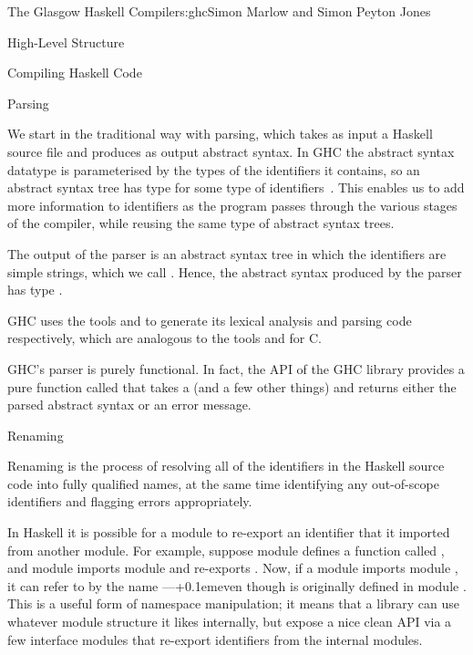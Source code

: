 \begin{aosachapter}{The Glasgow Haskell Compiler}{s:ghc}{Simon Marlow and Simon Peyton Jones}
\begin{aosasect1}{High-Level Structure}
\begin{aosasect2}{Compiling Haskell Code}

\begin{aosasect3}{Parsing}

We start in the traditional way with parsing, which takes as input a
Haskell source file and produces as output abstract syntax.  In GHC
the abstract syntax datatype  is parameterised by the
types of the identifiers it contains, so an abstract syntax tree has
type  for some type of identifiers~.  This
enables us to add more information to identifiers as the program
passes through the various stages of the compiler, while reusing the
same type of abstract syntax trees.

The output of the parser is an abstract syntax tree in which the
identifiers are simple strings, which we call .  Hence,
the abstract syntax produced by the parser has type .

GHC uses the tools  and  to generate its
lexical analysis and parsing code respectively, which are analogous to
the tools  and  for C.

GHC's parser is purely functional.  In fact, the API of the GHC
library provides a pure function called  that takes a
 (and a few other things) and returns either the parsed
abstract syntax or an error message.

\end{aosasect3}

\begin{aosasect3}{Renaming}

Renaming is the process of resolving all of the identifiers in the
Haskell source code into fully qualified names, at the same time
identifying any out-of-scope identifiers and flagging errors
appropriately.

In Haskell it is possible for a module to re-export an identifier that
it imported from another module.  For example, suppose module 
defines a function called , and module  imports module
 and re-exports .  Now, if a module  imports
module , it can refer to  by the name
---\kern+0.1emeven though  is originally 
defined in module
.  This is a useful form of namespace manipulation; it means
that a library can use whatever module structure it likes internally,
but expose a nice clean API via a few interface modules that re-export
identifiers from the internal modules.


\end{aosasect3}
\end{aosasect2}
\end{aosasect1}
\end{aosachapter}
